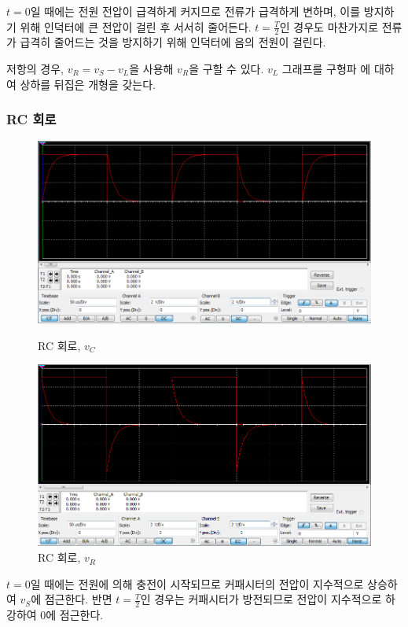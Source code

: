 \documentclass{article}
\begin{document}
$t=0$일 때에는 전원 전압이 급격하게 커지므로 전류가 급격하게 변하며, 이를 방지하기
위해 인덕터에 큰 전압이 걸린 후 서서히 줄어든다. $t=\frac{T}{2}$인 경우도 마찬가지로
전류가 급격히 줄어드는 것을 방지하기 위해 인덕터에 음의 전원이 걸린다.

저항의 경우, $v_R = v_S - v_L$을 사용해 $v_R$을 구할 수 있다. $v_L$ 그래프를 구형파
에 대하여 상하를 뒤집은 개형을 갖는다.

\subsubsection{RC 회로}
\begin{figure}[H]
\centering
\begin{minipage}{.5\textwidth}
	\centering
	\includegraphics[width=.9\linewidth]{1-b-v_c}
	\caption{RC 회로, $v_C$}
\end{minipage}%
\begin{minipage}{.5\textwidth}
	\centering
	\includegraphics[width=.9\linewidth]{1-b-v_r}
	\caption{RC 회로, $v_R$}
\end{minipage}
\end{figure}

$t=0$일 때에는 전원에 의해 충전이 시작되므로 커패시터의 전압이 지수적으로 상승하여
$v_S$에 점근한다. 반면 $t=\frac{T}{2}$인 경우는 커패시터가 방전되므로 전압이 지수적으로
하강하여 0에 점근한다.
\end{document}
